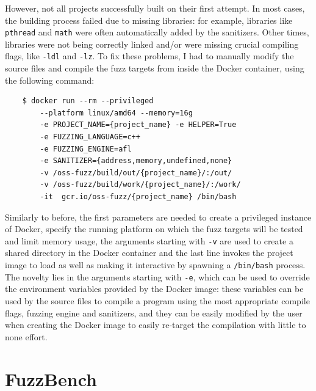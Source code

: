 \newpage
However, not all projects successfully built on their first attempt.
In most cases, the building process failed due to missing libraries: for example, libraries like \verb|pthread| and \verb|math| were often automatically added by the sanitizers. Other times, libraries were not being correctly linked and/or were missing crucial compiling flags, like \verb|-ldl| and \verb|-lz|. To fix these problems, I had to manually modify the source files and compile the fuzz targets from inside the Docker container, using the following command:
\begin{verbatim}
    $ docker run --rm --privileged 
        --platform linux/amd64 --memory=16g
        -e PROJECT_NAME={project_name} -e HELPER=True 
        -e FUZZING_LANGUAGE=c++ 
        -e FUZZING_ENGINE=afl 
        -e SANITIZER={address,memory,undefined,none} 
        -v /oss-fuzz/build/out/{project_name}/:/out/   
        -v /oss-fuzz/build/work/{project_name}/:/work/
        -it  gcr.io/oss-fuzz/{project_name} /bin/bash
\end{verbatim}
Similarly to before, the first parameters are needed to create a privileged instance of Docker, specify the running platform on which the fuzz targets will be tested and limit memory usage, the arguments starting with \verb|-v| are used to create a shared directory in the Docker container and the last line invokes the project image to load as well as making it interactive by spawning a \verb|/bin/bash| process.
The novelty lies in the arguments starting with \verb|-e|, which can be used to override the environment variables provided by the Docker image: these variables can be used by the source files to compile a program using the most appropriate compile flags, fuzzing engine and sanitizers, and they can be easily modified by the user when creating the Docker image to easily re-target the compilation with little to none effort. 













\newpage
\section{FuzzBench}
